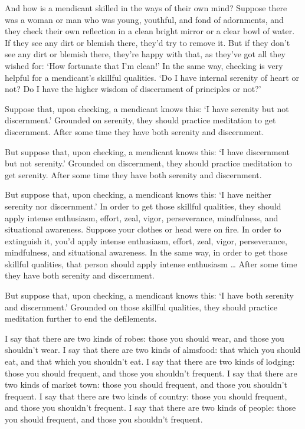 \documentclass[12pt,openany]{book}%
\begin{document}
And how is a mendicant skilled in the ways of their own mind? Suppose there was a woman or man who was young, youthful, and fond of adornments, and they check their own reflection in a clean bright mirror or a clear bowl of water. If they see any dirt or blemish there, they’d try to remove it. But if they don’t see any dirt or blemish there, they’re happy with that, as they’ve got all they wished for: ‘How fortunate that I’m clean!’ In the same way, checking is very helpful for a mendicant’s skillful qualities. ‘Do I have internal serenity of heart or not? Do I have the higher wisdom of discernment of principles or not?’ 

Suppose that, upon checking, a mendicant knows this: ‘I have serenity but not discernment.’ Grounded on serenity, they should practice meditation to get discernment. After some time they have both serenity and discernment. 

But suppose that, upon checking, a mendicant knows this: ‘I have discernment but not serenity.’ Grounded on discernment, they should practice meditation to get serenity. After some time they have both serenity and discernment. 

But suppose that, upon checking, a mendicant knows this: ‘I have neither serenity nor discernment.’ In order to get those skillful qualities, they should apply intense enthusiasm, effort, zeal, vigor, perseverance, mindfulness, and situational awareness. Suppose your clothes or head were on fire. In order to extinguish it, you’d apply intense enthusiasm, effort, zeal, vigor, perseverance, mindfulness, and situational awareness. In the same way, in order to get those skillful qualities, that person should apply intense enthusiasm … After some time they have both serenity and discernment. 

But suppose that, upon checking, a mendicant knows this: ‘I have both serenity and discernment.’ Grounded on those skillful qualities, they should practice meditation further to end the defilements. 

I say that there are two kinds of robes: those you should wear, and those you shouldn’t wear. I say that there are two kinds of almsfood: that which you should eat, and that which you shouldn’t eat. I say that there are two kinds of lodging: those you should frequent, and those you shouldn’t frequent. I say that there are two kinds of market town: those you should frequent, and those you shouldn’t frequent. I say that there are two kinds of country: those you should frequent, and those you shouldn’t frequent. I say that there are two kinds of people: those you should frequent, and those you shouldn’t frequent. 
\end{document}
